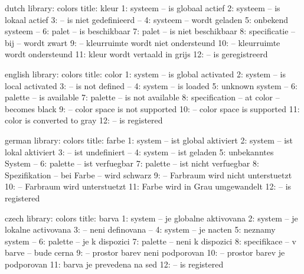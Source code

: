 



\startmessages  dutch  library: colors
  title: kleur
      1: systeem -- is globaal actief
      2: systeem -- is lokaal actief
      3: -- is niet gedefinieerd --
      4: systeem -- wordt geladen
      5: onbekend systeem --
      6: palet -- is beschikbaar
      7: palet -- is niet beschikbaar
      8: specificatie -- bij -- wordt zwart
      9: -- kleurruimte wordt niet ondersteund
     10: -- kleurruimte wordt ondersteund
     11: kleur wordt vertaald in grijs
     12: -- is geregistreerd
\stopmessages

\startmessages  english  library: colors
  title: color
      1: system -- is global activated
      2: system -- is local activated
      3: -- is not defined --
      4: system -- is loaded
      5: unknown system --
      6: palette -- is available
      7: palette -- is not available
      8: specification -- at color -- becomes black
      9: -- color space is not supported
     10: -- color space is supported
     11: color is converted to gray
     12: -- is registered
\stopmessages

\startmessages  german  library: colors
  title: farbe
      1: system -- ist global aktiviert
      2: system -- ist lokal aktiviert
      3: -- ist undefiniert --
      4: system -- ist geladen
      5: unbekanntes System --
      6: palette -- ist verfuegbar
      7: palette -- ist nicht verfuegbar
      8: Spezifikation -- bei Farbe -- wird schwarz
      9: -- Farbraum wird nicht unterstuetzt
     10: -- Farbraum wird unterstuetzt
     11: Farbe wird in Grau umgewandelt
     12: -- is registered
\stopmessages

\startmessages  czech  library: colors
  title: barva
      1: system -- je globalne aktivovana
      2: system -- je lokalne activovana
      3: -- neni definovana --
      4: system -- je nacten
      5: neznamy system --
      6: palette -- je k dispozici
      7: palette -- neni k dispozici
      8: specifikace -- v barve -- bude cerna
      9: -- prostor barev neni podporovan
     10: -- prostor barev je podporovan
     11: barva je prevedena na sed
     12: -- is registered
\stopmessages

